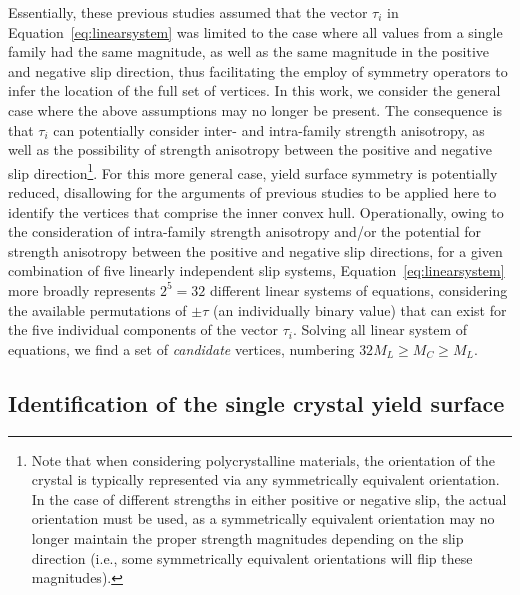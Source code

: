 \documentclass[preprint,3p,times,sort&compress,letterpaper,12pt]{elsarticle} %
\begin{document}
Essentially, these previous studies assumed that the vector $\tau_i$ in Equation~\ref{eq:linearsystem} was limited to the case where all values from a single family had the same magnitude, as well as the same magnitude in the positive and negative slip direction, thus facilitating the employ of symmetry operators to infer the location of the full set of vertices. In this work, we consider the general case where the above assumptions may no longer be present. The consequence is that $\tau_i$ can potentially consider inter- and intra-family strength anisotropy, as well as the possibility of strength anisotropy between the positive and negative slip direction\footnote{Note that when considering polycrystalline materials, the orientation of the crystal is typically represented via any symmetrically equivalent orientation. In the case of different strengths in either positive or negative slip, the actual orientation must be used, as a symmetrically equivalent orientation may no longer maintain the proper strength magnitudes depending on the slip direction (i.e., some symmetrically equivalent orientations will flip these magnitudes).}. For this more general case, yield surface symmetry is potentially reduced, disallowing for the arguments of previous studies to be applied here to identify the vertices that comprise the inner convex hull. Operationally, owing to the consideration of intra-family strength anisotropy and/or the potential for strength anisotropy between the positive and negative slip directions, for a given combination of five linearly independent slip systems, Equation~\ref{eq:linearsystem} more broadly represents $2^5=32$ different linear systems of equations, considering the available permutations of $\pm \tau$ (an individually binary value) that can exist for the five individual components of the vector $\tau_i$. Solving all linear system of equations, we find a set of \emph{candidate} vertices, numbering $32M_L \geq M_C \geq M_L$.


\subsection{Identification of the single crystal yield surface}
\label{subsec:scys}
\end{document}
